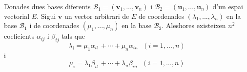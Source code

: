 \begin{teorema}
Donades dues bases diferents $\mathcal{B}_{1}=(\mathbf{v}_{1},...,\mathbf{v}%
_{n})$ i $\mathcal{B}_{2}=(\mathbf{u}_{1},..., \mathbf{u}_{n})$ d’un
espai vectorial $E$. Sigui $\mathbf{v}$ un vector arbitrari de $%
E$ de coordenades $(\lambda _{1},...,\lambda _{n})$ en la base $%
\mathcal{B}_{1}$ i de coordenades $(\mu _{1},...,\mu _{n})$ en la base $%
\mathcal{B}_{2}$. Aleshores existeixen $n^{2}$ coeficients $\alpha _{ij}$ i $%
\beta_{ij}$ tals que 
\begin{equation*}
\lambda _{i}=\mu _{1}\alpha _{i1}+\cdots +\mu _{n}\alpha _{in}\text{ \ \ }
(i=1,...,n)
\end{equation*}%
i 
\begin{equation*}
\mu _{i}=\lambda _{1}\beta _{i1}+\cdots +\lambda _{n}\beta _{in}\text{ \ \ }
(i=1,...,n)
\end{equation*}

\end{teorema}
